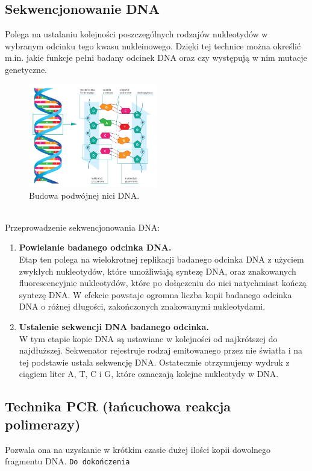 \documentclass[a4paper, twocolumn]{article}
\begin{document}
\subsection{Sekwencjonowanie DNA}%
\label{sub:Sekwencjonowanie DNA}
Polega na ustalaniu kolejności poszczególnych rodzajów nukleotydów w wybranym odcinku tego kwasu nukleinowego.
Dzięki tej technice można określić m.in. jakie funkcje pełni badany odcinek DNA oraz czy występują w nim mutacje genetyczne.
\begin{figure}[h]	
	\includegraphics[width=0.5\textwidth]{dna1.png}
	\caption{Budowa podwójnej nici DNA.}
	\label{fig:}
\end{figure} \\
Przeprowadzenie sekwencjonowania DNA:
\begin{enumerate}
	\item \textbf{Powielanie badanego odcinka DNA.} \\
	Etap ten polega na wielokrotnej replikacji badanego odcinka DNA z użyciem zwykłych nukleotydów, które umożliwiają syntezę DNA, oraz znakowanych fluorescencyjnie nukleotydów, które po dołączeniu do nici natychmiast kończą syntezę DNA.
	W efekcie powstaje ogromna liczba kopii badanego odcinka DNA o różnej długości, zakończonych znakowanymi nukleotydami.
	\item \textbf{Ustalenie sekwencji DNA badanego odcinka.} \\
	W tym etapie kopie DNA są ustawiane w kolejności od najkrótszej do najdłuższej. Sekwenator rejestruje rodzaj emitowanego przez nie światła i na tej podstawie ustala sekwencję DNA.
	Ostatecznie otrzymujemy wydruk z ciągiem liter A, T, C i G, które oznaczają kolejne nukleotydy w DNA.
\end{enumerate}
\subsection{Technika PCR (łańcuchowa reakcja polimerazy)}%
\label{sub:Technika PCR (łańcuchowa reakcja polimerazy)}
Pozwala ona na uzyskanie w krótkim czasie dużej ilości kopii dowolnego fragmentu DNA. \texttt{Do dokończenia}
\end{document}
